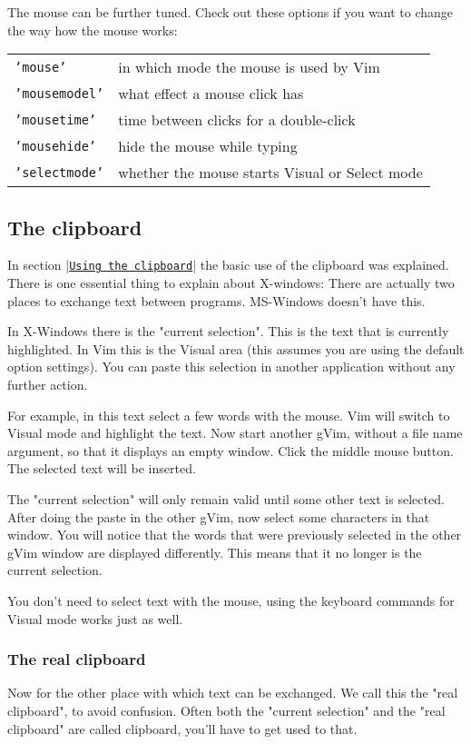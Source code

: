 The mouse can be further tuned.
Check out these options if you want to change the way how the mouse works:

\begin{center}\begin{longtable}{l l}
				\texttt{'mouse'} & in which mode the mouse is used by Vim \\
				\texttt{'mousemodel'} & what effect a mouse click has \\
				\texttt{'mousetime'} & time between clicks for a double-click \\
				\texttt{'mousehide'} & hide the mouse while typing \\
				\texttt{'selectmode'} & whether the mouse starts Visual or Select mode \\
\end{longtable}\end{center}
\subsection{The clipboard}
In section |\hyperref[Using the clipboard]{\texttt{Using the clipboard}}| the basic use of the clipboard was explained.
There is one essential thing to explain about X-windows: There are actually two places to exchange text between programs.
MS-Windows doesn't have this.

In X-Windows there is the "current selection".
This is the text that is currently highlighted.
In Vim this is the Visual area (this assumes you are using the default option settings).
You can paste this selection in another application without any further action.

For example, in this text select a few words with the mouse.
Vim will switch to Visual mode and highlight the text.
Now start another gVim, without a file name argument, so that it displays an empty window.
Click the middle mouse button.
The selected text will be inserted.

The "current selection" will only remain valid until some other text is selected.
After doing the paste in the other gVim, now select some characters in that window.
You will notice that the words that were previously selected in the other gVim window are displayed differently.
This means that it no longer is the current selection.

You don't need to select text with the mouse, using the keyboard commands for Visual mode works just as well.
\subsubsection{The real clipboard}
Now for the other place with which text can be exchanged.
We call this the "real clipboard", to avoid confusion.
Often both the "current selection" and the "real clipboard" are called clipboard, you'll have to get used to that.

